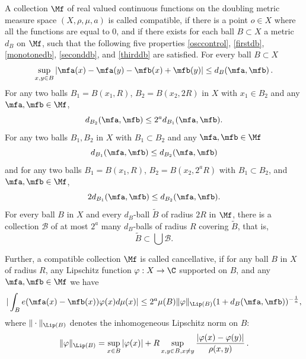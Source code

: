 A collection $\Mf$ of real valued continuous functions on the doubling metric measure space $(X,\rho,\mu,a)$ is called compatible,
if there is a point $o\in X$ where all the functions are equal to $0$,
and if there exists for each ball $B \subset X$ a metric $d_B$ on $\Mf$,
such that the following five properties \eqref{osccontrol}, \eqref{firstdb}, \eqref{monotonedb}, \eqref{seconddb}, and \eqref{thirddb} are satisfied.
For every ball $B \subset X$
\begin{equation}\label{osccontrol}
    \sup_{x,y\in B}|\mfa(x)-{\mfa(y)}- \mfb(x)+{\mfb(y)}| \le d_{B}(\mfa,\mfb)\,.
\end{equation}
For any two balls $B_1=B(x_1,R)$, $B_2= B(x_2,2R)$ in $X$ with $x_1\in B_2$ and any $\mfa,\mfb\in \Mf$,
\begin{equation}\label{firstdb}
    d_{B_2}(\mfa,\mfb)\le 2^a d_{B_1}(\mfa,\mfb) .
\end{equation}
For any two balls $B_1, B_2$ in $X$ with $B_1 \subset B_2$ and any $\mfa, \mfb \in \Mf$
\begin{equation}\label{monotonedb}
    d_{B_1}(\mfa,\mfb) \le d_{B_2}(\mfa, \mfb)
\end{equation}
and for any two balls
$B_1=B(x_1,R)$, $B_2= B(x_2,2^aR)$
with $B_1\subset B_2$, and $\mfa,\mfb\in \Mf$,
\begin{equation}\label{seconddb}
    2d_{B_1}(\mfa,\mfb)
\le d_{B_2}(\mfa,\mfb) .
\end{equation}
For every ball $B$ in $X$ and every $d_B$-ball $\tilde B$ of radius $2R$ in $\Mf$, there is a collection $\mathcal{B}$ of
at most $2^a$ many $d_B$-balls of radius $R$ covering $\tilde B$, that is,
\begin{equation}\label{thirddb}
    \tilde B\subset \bigcup \mathcal{B}.
\end{equation}


Further, a compatible collection $\Mf$ is called cancellative, if
for any ball $B$ in $X$ of radius $R$, any Lipschitz function $\varphi: X\to \C$
supported on $B$, and any $\mfa,\mfb\in \Mf$ we have
\begin{equation}
    \label{eq-vdc-cond}
    |\int_B e(\mfa(x)-{\mfb(x)}) \varphi(x) d\mu(x)|\le 2^a \mu(B)\|\varphi\|_{\Lip(B)}
(1+d_B(\mfa,\mfb))^{-\frac{1}{a}},
\end{equation}
where $\|\cdot\|_{\Lip(B)}$ denotes the inhomogeneous Lipschitz norm on $B$:
$$
    \|\varphi\|_{\Lip(B)} = \sup_{x \in B} |\varphi(x)| + R \sup_{x,y \in B, x \neq y} \frac{|\varphi(x) - \varphi(y)|}{\rho(x,y)}\,.
$$

